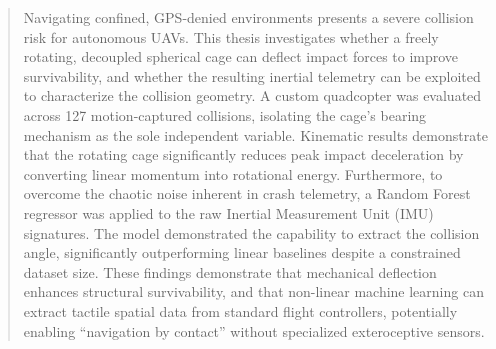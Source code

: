 \begin{abstract}

Navigating confined, GPS-denied environments presents a severe collision risk for autonomous UAVs. This thesis investigates whether a freely rotating, decoupled spherical cage can deflect impact forces to improve survivability, and whether the resulting inertial telemetry can be exploited to characterize the collision geometry. A custom quadcopter was evaluated across 127 motion-captured collisions, isolating the cage's bearing mechanism as the sole independent variable. Kinematic results demonstrate that the rotating cage significantly reduces peak impact deceleration by converting linear momentum into rotational energy. Furthermore, to overcome the chaotic noise inherent in crash telemetry, a Random Forest regressor was applied to the raw Inertial Measurement Unit (IMU) signatures. The model demonstrated the capability to extract the collision angle, significantly outperforming linear baselines despite a constrained dataset size. These findings demonstrate that mechanical deflection enhances structural survivability, and that non-linear machine learning can extract tactile spatial data from standard flight controllers, potentially enabling ``navigation by contact'' without specialized exteroceptive sensors.

\end{abstract}
